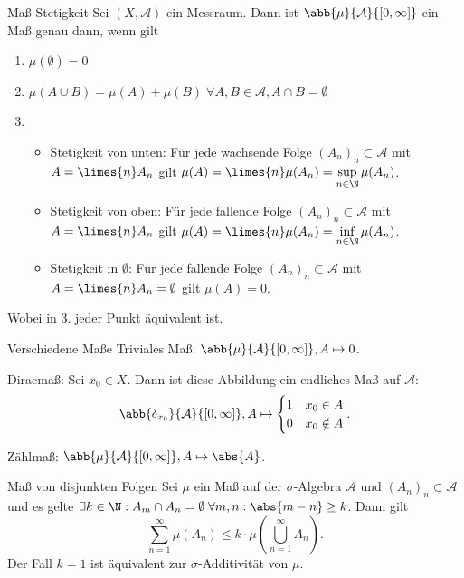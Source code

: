 \begin{karte}{Maß Stetigkeit}
	Sei \( (X, \mathcal{A}) \) ein Messraum. Dann ist \( \abb{\mu}{\mathcal{A}}{[0,\infty]} \) ein Maß genau dann, wenn gilt 
	\begin{enumerate}
		\item \(\mu(\emptyset) = 0\)
		\item \( \mu(A\cup B) = \mu(A) + \mu(B) \;\forall A,B\in \mathcal{A}, A\cap B = \emptyset \)
		\item \begin{itemize}
			\item Stetigkeit von unten: Für jede wachsende Folge \( (A_n)_n \subset \mathcal{A} \) mit \(A = \limes{n} A_n\) gilt \(\mu(A) = \limes{n} \mu(A_n) = \sup\limits_{n\in\N} \mu(A_n) \).
			\item Stetigkeit von oben: Für jede fallende Folge \( (A_n)_n \subset \mathcal{A} \) mit \(A = \limes{n} A_n\) gilt \(\mu(A) = \limes{n} \mu(A_n) = \inf\limits_{n\in\N} \mu(A_n) \).
			\item Stetigkeit in \(\emptyset\): Für jede fallende Folge \( (A_n)_n \subset \mathcal{A} \) mit \( A = \limes{n} A_n = \emptyset \) gilt \( \mu(A) = 0 \).
		\end{itemize}
	\end{enumerate}
	Wobei in 3. jeder Punkt äquivalent ist.
\end{karte}

\begin{karte}{Verschiedene Maße}
	Triviales Maß: \( \abb{\mu}{\mathcal{A}}{[0,\infty]}, A \mapsto 0 \).
	
	Diracmaß: Sei \( x_0 \in X \). Dann ist diese 
	Abbildung ein endliches Maß auf \(\mathcal{A}\):
	\[ \abb{\delta_{x_0}}{\mathcal{A}}{[0,\infty]}, 
	A \mapsto \begin{cases}
		1 &x_0 \in A \\
		0 & x_0 \notin A
	\end{cases}. \]

	
	Zählmaß: \( \abb{\mu}{\mathcal{A}}{[0,\infty]}, A \mapsto \abs{A} \).
\end{karte}

\begin{karte}{Maß von disjunkten Folgen}
	Sei \(\mu\) ein Maß auf der \(\sigma\)-Algebra \(\mathcal{A}\) und \( (A_n)_n \subset \mathcal{A} \) 
	und es gelte \( \exists k\in \N: A_m \cap A_n = \emptyset \;\forall m,n: \abs{m-n}\geq k \). Dann gilt 
	\[ \sum_{n=1}^{\infty} \mu(A_n) \leq k \cdot \mu \left( \bigcup_{n=1}^\infty A_n \right). \]
	Der Fall \(k = 1\) ist äquivalent zur \(\sigma\)-Additivität von \(\mu\).
\end{karte}